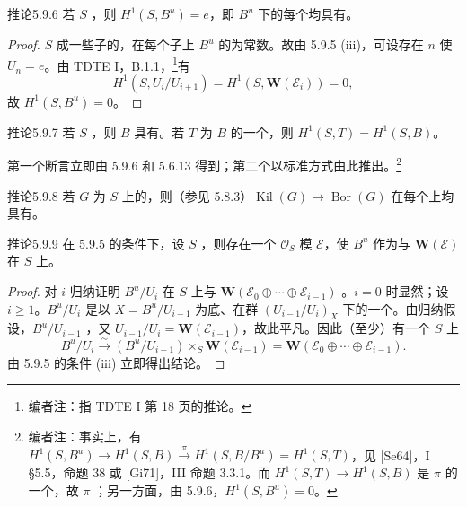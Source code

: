 \begin{SGAresult}{推论}{5.9.6}
若 $S$ ，则 $H^1(S,B^u)=e$，即 $B^u$ 下的每个均具有。
\end{SGAresult}
\begin{proof}
$S$ 成一些子的，在每个子上 $B^u$ 的为常数。故由 5.9.5 (iii)，可设存在 $n$ 使 $U_n=e$。由 TDTE I，B.1.1，\footnote{编者注：指 TDTE I 第 18 页的推论。}有
\[H^1(S,U_i/U_{i+1})=H^1(S,\mathbf W(\mathcal E_i))=0,\]
故 $H^1(S,B^u)=0$。
\end{proof}
\begin{SGAresult}{推论}{5.9.7}
若 $S$ ，则 $B$ 具有。若 $T$ 为 $B$ 的一个，则 $H^1(S,T)=H^1(S,B)$。
\end{SGAresult}
第一个断言立即由 5.9.6 和 5.6.13 得到；第二个以标准方式由此推出。\footnote{编者注：事实上，有 $H^1(S,B^u)\to H^1(S,B)\xrightarrow\pi H^1(S,B/B^u)=H^1(S,T)$，见 [Se64]，I \S 5.5，命题 38 或 [Gi71]，III 命题 3.3.1。而 $H^1(S,T)\to H^1(S,B)$ 是 $\pi$ 的一个，故 $\pi$ ；另一方面，由 5.9.6，$H^1(S,B^u)=0$。}
\begin{SGAresult}{推论}{5.9.8}
若 $G$ 为 $S$ 上的，则（参见 5.8.3）$\operatorname{Kil}(G)\to\operatorname{Bor}(G)$ 在每个上均具有。
\end{SGAresult}
\begin{SGAresult}{推论}{5.9.9}
在 5.9.5 的条件下，设 $S$ ，则存在一个 $\mathcal O_S$ 模 $\mathcal E$，使 $B^u$ 作为与 $\mathbf W(\mathcal E)$ 在 $S$ 上。
\end{SGAresult}
\begin{proof}
对 $i$ 归纳证明 $B^u/U_i$ 在 $S$ 上与 $\mathbf W(\mathcal E_0\oplus\cdots\oplus\mathcal E_{i-1})$ 。$i=0$ 时显然；设 $i\ge1$。$B^u/U_i$ 是以 $X=B^u/U_{i-1}$ 为底、在群 $(U_{i-1}/U_i)_X$ 下的一个。由归纳假设，$B^u/U_{i-1}$ ，又 $U_{i-1}/U_i=\mathbf W(\mathcal E_{i-1})$，故此平凡。因此（至少）有一个 $S$ 上
\[B^u/U_i\xrightarrow\sim(B^u/U_{i-1})\times_S\mathbf W(\mathcal E_{i-1})
=\mathbf W(\mathcal E_0\oplus\cdots\oplus\mathcal E_{i-1}).\]
由 5.9.5 的条件 (iii) 立即得出结论。
\end{proof}
